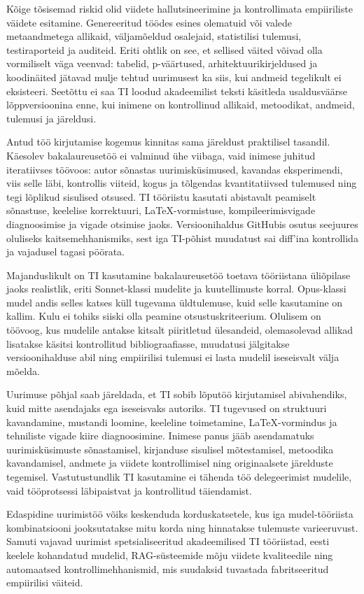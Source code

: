 Kõige tõsisemad riskid olid viidete hallutsineerimine ja kontrollimata empiiriliste väidete esitamine. Genereeritud töödes esines olematuid või valede metaandmetega allikaid, väljamõeldud osalejaid, statistilisi tulemusi, testiraporteid ja auditeid. Eriti ohtlik on see, et sellised väited võivad olla vormiliselt väga veenvad: tabelid, p-väärtused, arhitektuurikirjeldused ja koodinäited jätavad mulje tehtud uurimusest ka siis, kui andmeid tegelikult ei eksisteeri. Seetõttu ei saa TI loodud akadeemilist teksti käsitleda usaldusväärse lõppversioonina enne, kui inimene on kontrollinud allikaid, metoodikat, andmeid, tulemusi ja järeldusi.

Antud töö kirjutamise kogemus kinnitas sama järeldust praktilisel tasandil. Käesolev bakalaureusetöö ei valminud ühe viibaga, vaid inimese juhitud iteratiivses töövoos: autor sõnastas uurimisküsimused, kavandas eksperimendi, viis selle läbi, kontrollis viiteid, kogus ja tõlgendas kvantitatiivsed tulemused ning tegi lõplikud sisulised otsused. TI tööriistu kasutati abistavalt peamiselt sõnastuse, keelelise korrektuuri, \LaTeX{}-vormistuse, kompileerimisvigade diagnoosimise ja vigade otsimise jaoks. Versioonihaldus GitHubis osutus seejuures oluliseks kaitsemehhanismiks, sest iga TI-põhist muudatust sai diff'ina kontrollida ja vajadusel tagasi pöörata.

Majanduslikult on TI kasutamine bakalaureusetöö toetava tööriistana üliõpilase jaoks realistlik, eriti Sonnet-klassi mudelite ja kuutellimuste korral. Opus-klassi mudel andis selles katses küll tugevama üldtulemuse, kuid selle kasutamine on kallim. Kulu ei tohiks siiski olla peamine otsustuskriteerium. Olulisem on töövoog, kus mudelile antakse kitsalt piiritletud ülesandeid, olemasolevad allikad lisatakse käsitsi kontrollitud bibliograafiasse, muudatusi jälgitakse versioonihalduse abil ning empiirilisi tulemusi ei lasta mudelil iseseisvalt välja mõelda.

Uurimuse põhjal saab järeldada, et TI sobib lõputöö kirjutamisel abivahendiks, kuid mitte asendajaks ega iseseisvaks autoriks. TI tugevused on struktuuri kavandamine, mustandi loomine, keeleline toimetamine, \LaTeX{}-vormindus ja tehniliste vigade kiire diagnoosimine. Inimese panus jääb asendamatuks uurimisküsimuste sõnastamisel, kirjanduse sisulisel mõtestamisel, metoodika kavandamisel, andmete ja viidete kontrollimisel ning originaalsete järelduste tegemisel. Vastutustundlik TI kasutamine ei tähenda töö delegeerimist mudelile, vaid tööprotsessi läbipaistvat ja kontrollitud täiendamist.

Edaspidine uurimistöö võiks keskenduda korduskatsetele, kus iga mudel-tööriista kombinatsiooni jooksutatakse mitu korda ning hinnatakse tulemuste varieeruvust. Samuti vajavad uurimist spetsialiseeritud akadeemilised TI tööriistad, eesti keelele kohandatud mudelid, RAG-süsteemide mõju viidete kvaliteedile ning automaatsed kontrollimehhanismid, mis suudaksid tuvastada fabritseeritud empiirilisi väiteid.
